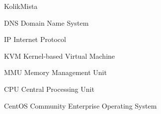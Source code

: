 \begin{seznamzkratek}{KolikMista}

		{DNS}
		{Domain Name System}
		
		{IP}
		{Internet Protocol}
		
		{KVM}
		{Kernel-based Virtual Machine}
		
		{MMU}
		{Memory Management Unit}
		
		{CPU}
		{Central Processing Unit}
		
		{CentOS}
		{Community Enterprise Operating System}


\end{seznamzkratek}
